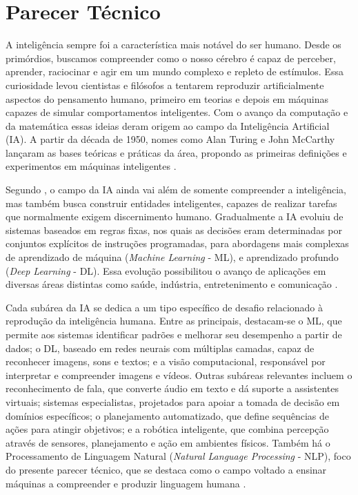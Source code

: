 \chapter{Parecer Técnico} \label{cha:parecertecnico}

A inteligência sempre foi a característica mais notável do ser humano. Desde os primórdios, buscamos compreender como o nosso cérebro é capaz de perceber, aprender, raciocinar e agir em um mundo complexo e repleto de estímulos. Essa curiosidade levou cientistas e filósofos a tentarem reproduzir artificialmente aspectos do pensamento humano, primeiro em teorias e depois em máquinas capazes de simular comportamentos inteligentes. Com o avanço da computação e da matemática essas ideias deram origem ao campo da Inteligência Artificial (IA). A partir da década de 1950, nomes como Alan Turing e John McCarthy lançaram as bases teóricas e práticas da área, propondo as primeiras definições e experimentos em máquinas inteligentes \cite{haenlein2019brief}.

Segundo \textcite{russell2022}, o campo da IA ainda vai além de somente compreender a inteligência, mas também busca construir entidades inteligentes, capazes de realizar tarefas que normalmente exigem discernimento humano.
Gradualmente a IA evoluiu de sistemas baseados em regras fixas, nos quais as decisões eram determinadas por conjuntos explícitos de instruções programadas, para abordagens mais complexas de aprendizado de máquina (\textit{Machine Learning} - ML), e aprendizado profundo (\textit{Deep Learning} - DL). Essa evolução possibilitou o avanço de aplicações em diversas áreas distintas como saúde, indústria, entretenimento e comunicação \cite{nilsson2010quest}.

Cada subárea da IA se dedica a um tipo específico de desafio relacionado à reprodução da inteligência humana. Entre as principais, destacam-se o ML, que permite aos sistemas identificar padrões e melhorar seu desempenho a partir de dados; o DL, baseado em redes neurais com múltiplas camadas, capaz de reconhecer imagens, sons e textos; e a visão computacional, responsável por interpretar e compreender imagens e vídeos.
Outras subáreas relevantes incluem o reconhecimento de fala, que converte áudio em texto e dá suporte a assistentes virtuais; sistemas especialistas, projetados para apoiar a tomada de decisão em domínios específicos; o planejamento automatizado, que define sequências de ações para atingir objetivos; e a robótica inteligente, que combina percepção através de sensores, planejamento e ação em ambientes físicos.
Também há o Processamento de Linguagem Natural (\textit{Natural Language Processing} - NLP), foco do presente parecer técnico, que se destaca como o campo voltado a ensinar máquinas a compreender e produzir linguagem humana \cite{russell2022}.

